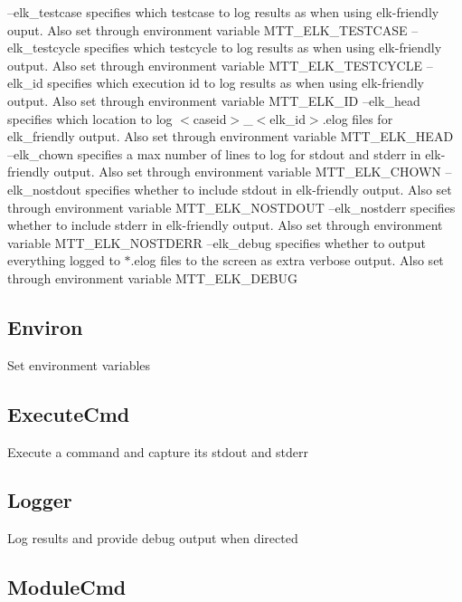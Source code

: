 --elk\-\_\-testcase specifies which testcase to log results as when using elk-\/friendly ouput. Also set through environment variable M\-T\-T\-\_\-\-E\-L\-K\-\_\-\-T\-E\-S\-T\-C\-A\-S\-E --elk\-\_\-testcycle specifies which testcycle to log results as when using elk-\/friendly output. Also set through environment variable M\-T\-T\-\_\-\-E\-L\-K\-\_\-\-T\-E\-S\-T\-C\-Y\-C\-L\-E --elk\-\_\-id specifies which execution id to log results as when using elk-\/friendly output. Also set through environment variable M\-T\-T\-\_\-\-E\-L\-K\-\_\-\-I\-D --elk\-\_\-head specifies which location to log $<$caseid$>$\-\_\-$<$elk\-\_\-id$>$.\-elog files for elk\-\_\-friendly output. Also set through environment variable M\-T\-T\-\_\-\-E\-L\-K\-\_\-\-H\-E\-A\-D --elk\-\_\-chown specifies a max number of lines to log for stdout and stderr in elk-\/friendly output. Also set through environment variable M\-T\-T\-\_\-\-E\-L\-K\-\_\-\-C\-H\-O\-W\-N --elk\-\_\-nostdout specifies whether to include stdout in elk-\/friendly output. Also set through environment variable M\-T\-T\-\_\-\-E\-L\-K\-\_\-\-N\-O\-S\-T\-D\-O\-U\-T --elk\-\_\-nostderr specifies whether to include stderr in elk-\/friendly output. Also set through environment variable M\-T\-T\-\_\-\-E\-L\-K\-\_\-\-N\-O\-S\-T\-D\-E\-R\-R --elk\-\_\-debug specifies whether to output everything logged to $\ast$.elog files to the screen as extra verbose output. Also set through environment variable M\-T\-T\-\_\-\-E\-L\-K\-\_\-\-D\-E\-B\-U\-G\hypertarget{group___utilities_Environ}{}\subsection{Environ}\label{group___utilities_Environ}
Set environment variables\hypertarget{group___utilities_ExecuteCmd}{}\subsection{Execute\-Cmd}\label{group___utilities_ExecuteCmd}
Execute a command and capture its stdout and stderr\hypertarget{group___utilities_Logger}{}\subsection{Logger}\label{group___utilities_Logger}
Log results and provide debug output when directed\hypertarget{group___utilities_ModuleCmd}{}\subsection{Module\-Cmd}\label{group___utilities_ModuleCmd}
